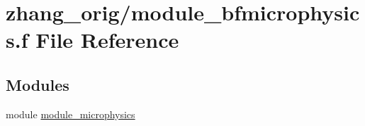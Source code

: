 \hypertarget{zhang__orig_2module__bfmicrophysics_8f}{}\section{zhang\+\_\+orig/module\+\_\+bfmicrophysics.f File Reference}
\label{zhang__orig_2module__bfmicrophysics_8f}
\subsection*{Modules}
\begin{DoxyCompactItemize}
\item 
module \hyperlink{namespacemodule__microphysics}{module\+\_\+microphysics}
\end{DoxyCompactItemize}

